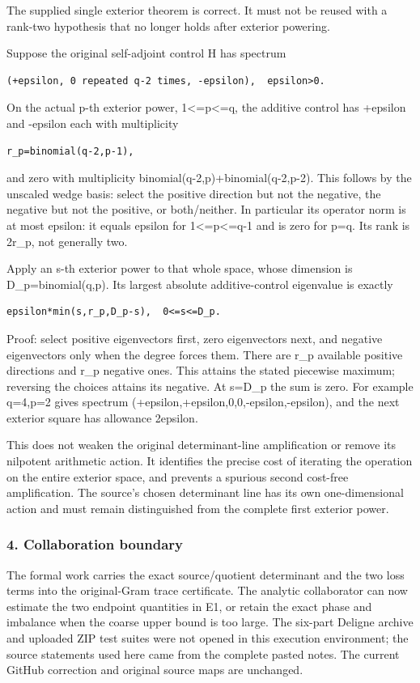 The supplied single exterior theorem is correct. It must not be reused with a rank-two hypothesis that no longer holds after exterior powering.

Suppose the original self-adjoint control H has spectrum

\begin{verbatim}
(+epsilon, 0 repeated q-2 times, -epsilon),  epsilon>0.
\end{verbatim}

On the actual p-th exterior power, 1\textless=p\textless=q, the additive control has +epsilon and -epsilon each with multiplicity

\begin{verbatim}
r_p=binomial(q-2,p-1),
\end{verbatim}

and zero with multiplicity binomial(q-2,p)+binomial(q-2,p-2). This follows by the unscaled wedge basis: select the positive direction but not the negative, the negative but not the positive, or both/neither. In particular its operator norm is at most epsilon: it equals epsilon for 1\textless=p\textless=q-1 and is zero for p=q. Its rank is 2r\_p, not generally two.

Apply an s-th exterior power to that whole space, whose dimension is D\_p=binomial(q,p). Its largest absolute additive-control eigenvalue is exactly

\begin{verbatim}
epsilon*min(s,r_p,D_p-s),  0<=s<=D_p.
\end{verbatim}

Proof: select positive eigenvectors first, zero eigenvectors next, and negative eigenvectors only when the degree forces them. There are r\_p available positive directions and r\_p negative ones. This attains the stated piecewise maximum; reversing the choices attains its negative. At s=D\_p the sum is zero. For example q=4,p=2 gives spectrum (+epsilon,+epsilon,0,0,-epsilon,-epsilon), and the next exterior square has allowance 2epsilon.

This does not weaken the original determinant-line amplification or remove its nilpotent arithmetic action. It identifies the precise cost of iterating the operation on the entire exterior space, and prevents a spurious second cost-free amplification. The source's chosen determinant line has its own one-dimensional action and must remain distinguished from the complete first exterior power.

\subsubsection{4. Collaboration boundary}\label{endpoint-pr23_corrected--collaboration-boundary}

The formal work carries the exact source/quotient determinant and the two loss terms into the original-Gram trace certificate. The analytic collaborator can now estimate the two endpoint quantities in E1, or retain the exact phase and imbalance when the coarse upper bound is too large. The six-part Deligne archive and uploaded ZIP test suites were not opened in this execution environment; the source statements used here came from the complete pasted notes. The current GitHub correction and original source maps are unchanged.

